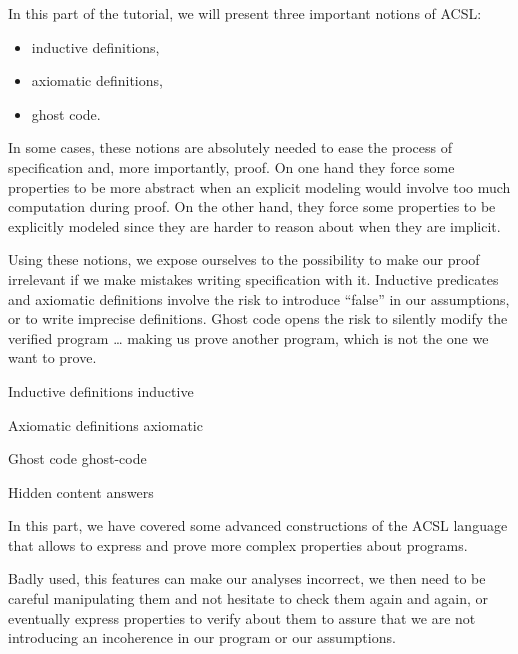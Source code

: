 In this part of the tutorial, we will present three important notions of ACSL:

\begin{itemize}
\item inductive definitions,
\item axiomatic definitions,
\item ghost code.
\end{itemize}


In some cases, these notions are absolutely needed to ease the process of
specification and, more importantly, proof. On one hand they force some
properties to be more abstract when an explicit modeling would involve too much
computation during proof. On the other hand, they force some properties to be
explicitly modeled since they are harder to reason about when they are implicit.

Using these notions, we expose ourselves to the possibility to make our
proof irrelevant if we make mistakes writing specification with it. Inductive
predicates and axiomatic definitions involve the risk to introduce ``false'' in
our assumptions, or to write imprecise definitions. Ghost code opens the risk
to silently modify the verified program \ldots{} making us prove another program,
which is not the one we want to prove.


\begin{levelTwo}
  {Inductive definitions}
  {inductive}
\end{levelTwo}

\begin{levelTwo}
  {Axiomatic definitions}
  {axiomatic}
\end{levelTwo}

\begin{levelTwo}
  {Ghost code}
  {ghost-code}
\end{levelTwo}

\begin{levelTwo}
  {Hidden content}
  {answers}
\end{levelTwo}


\horizontalLine
\newpage


In this part, we have covered some advanced constructions of the ACSL
language that allows to express and prove more complex properties about
programs.

Badly used, this features can make our analyses incorrect, we then need
to be careful manipulating them and not hesitate to check them again and
again, or eventually express properties to verify about them to assure
that we are not introducing an incoherence in our program or our
assumptions.
